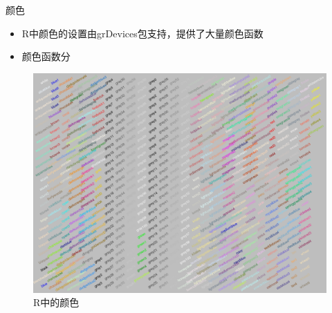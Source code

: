 \documentclass{beamerthemeMono}
\begin{document}
\begin{frame}[t]{\subsecname}{颜色}
\begin{itemize}
\item<1-> R中颜色的设置由grDevices包支持，提供了大量颜色函数
\item<2-> 颜色函数分
\end{itemize}

\begin{figure}
  \centering
  \includegraphics[width=0.7\columnwidth]{colors-example.png}
  \caption{R中的颜色} 
\end{figure}  
\end{frame}
\end{document}
